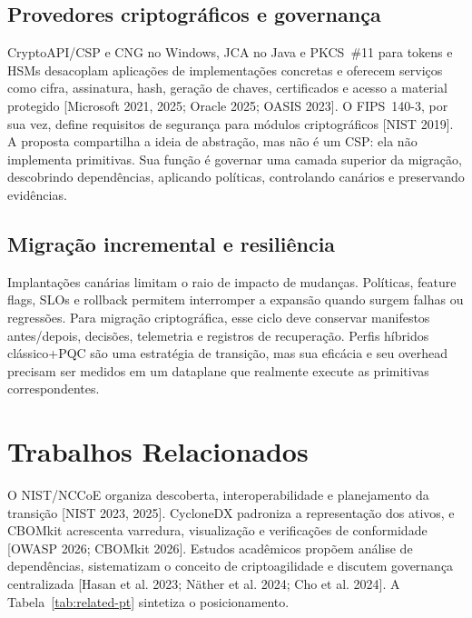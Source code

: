 \documentclass[12pt]{article}
\newcommand{\sbcshortcite}[2]{[#1]\nocite{#2}}
\begin{document}
\subsection{Provedores criptogr\'aficos e governan\c{c}a}
CryptoAPI/CSP e CNG no Windows, JCA no Java e PKCS~\#11 para tokens e HSMs desacoplam aplica\c{c}\~oes de implementa\c{c}\~oes concretas e oferecem servi\c{c}os como cifra, assinatura, hash, gera\c{c}\~ao de chaves, certificados e acesso a material protegido \sbcshortcite{Microsoft 2021, 2025; Oracle 2025; OASIS 2023}{microsoft-csp,microsoft-cng,oracle-jca,oasis-pkcs11}. O FIPS~140-3, por sua vez, define requisitos de seguran\c{c}a para m\'odulos criptogr\'aficos \sbcshortcite{NIST 2019}{fips1403}. A proposta compartilha a ideia de abstra\c{c}\~ao, mas n\~ao \'e um CSP: ela n\~ao implementa primitivas. Sua fun\c{c}\~ao \'e governar uma camada superior da migra\c{c}\~ao, descobrindo depend\^encias, aplicando pol\'iticas, controlando can\'arios e preservando evid\^encias.

\subsection{Migra\c{c}\~ao incremental e resili\^encia}
Implanta\c{c}\~oes can\'arias limitam o raio de impacto de mudan\c{c}as. Pol\'iticas, feature flags, SLOs e rollback permitem interromper a expans\~ao quando surgem falhas ou regress\~oes. Para migra\c{c}\~ao criptogr\'afica, esse ciclo deve conservar manifestos antes/depois, decis\~oes, telemetria e registros de recupera\c{c}\~ao. Perfis h\'ibridos cl\'assico+PQC s\~ao uma estrat\'egia de transi\c{c}\~ao, mas sua efic\'acia e seu overhead precisam ser medidos em um dataplane que realmente execute as primitivas correspondentes.

\section{Trabalhos Relacionados}
O NIST/NCCoE organiza descoberta, interoperabilidade e planejamento da transi\c{c}\~ao \sbcshortcite{NIST 2023, 2025}{nist1800b,nist1800c,nist-cswp39}. CycloneDX padroniza a representa\c{c}\~ao dos ativos, e CBOMkit acrescenta varredura, visualiza\c{c}\~ao e verifica\c{c}\~oes de conformidade \sbcshortcite{OWASP 2026; CBOMkit 2026}{cyclonedx-cbom,cbomkit}. Estudos acad\^emicos prop\~oem an\'alise de depend\^encias, sistematizam o conceito de criptoagilidade e discutem governan\c{c}a centralizada \sbcshortcite{Hasan et al. 2023; N\"ather et al. 2024; Cho et al. 2024}{hasan2023,naether2024,cho2024}. A Tabela~\ref{tab:related-pt} sintetiza o posicionamento.
\end{document}
